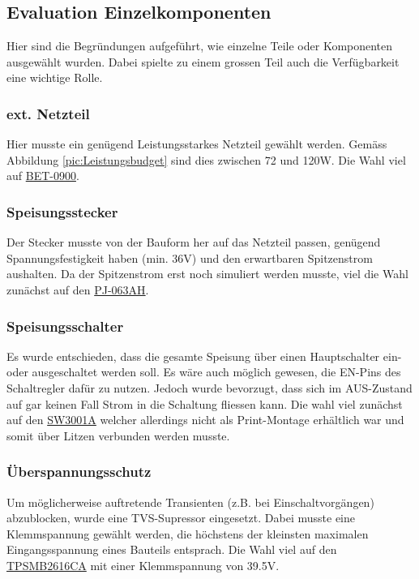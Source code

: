 \subsection{Evaluation Einzelkomponenten}
Hier sind die Begründungen aufgeführt, wie einzelne Teile oder Komponenten ausgewählt wurden. Dabei spielte zu einem grossen Teil auch die Verfügbarkeit eine wichtige Rolle.
\subsubsection{ext. Netzteil}
Hier musste ein genügend Leistungsstarkes Netzteil gewählt werden. Gemäss Abbildung \ref{pic:Leistungsbudget} sind dies zwischen 72 und 120W. Die Wahl viel auf  \href{https://www.bicker.de/files/downloads/datenblatt/bet-0900-t_e.pdf}{BET-0900}.
\subsubsection{Speisungsstecker}
Der Stecker musste von der Bauform her auf das Netzteil passen, genügend Spannungsfestigkeit haben (min. 36V) und den erwartbaren Spitzenstrom aushalten. Da der Spitzenstrom erst noch simuliert werden musste, viel die Wahl zunächst auf den \href{https://www.cuidevices.com/product/resource/pj-063ah.pdf}{PJ-063AH}.
\subsubsection{Speisungsschalter}
Es wurde entschieden, dass die gesamte Speisung über einen Hauptschalter ein- oder ausgeschaltet werden soll. Es wäre auch möglich gewesen, die EN-Pins des Schaltregler dafür zu nutzen. Jedoch wurde bevorzugt, dass sich im AUS-Zustand auf gar keinen Fall Strom in die Schaltung fliessen kann. Die wahl viel zunächst auf den \href{https://www.nkkswitches.com/pdf/SW-1.pdf}{SW3001A} welcher allerdings nicht als Print-Montage erhältlich war und somit über Litzen verbunden werden musste.
\subsubsection{Überspannungsschutz}
Um möglicherweise auftretende Transienten (z.B. bei Einschaltvorgängen) abzublocken, wurde eine TVS-Supressor eingesetzt. Dabei musste eine Klemmspannung gewählt werden, die höchstens der kleinsten maximalen Eingangsspannung eines Bauteils entsprach. Die Wahl viel auf den \href{https://www.littelfuse.com/assetdocs/tvs-diode-tpsmb-datasheet?assetguid=E7A196A8-A225-4724-AB76-7C22E0D48557}{TPSMB2616CA} mit einer Klemmspannung von 39.5V.
